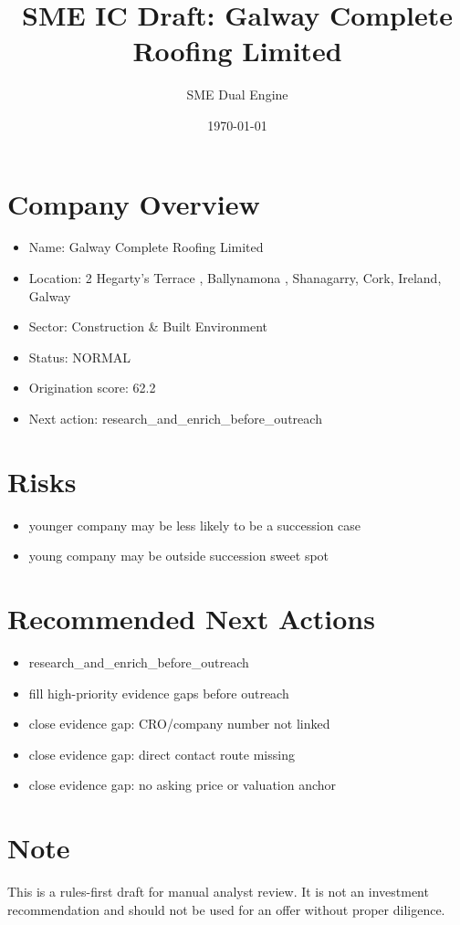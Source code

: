 \documentclass[11pt,a4paper]{article}
\title{SME IC Draft: Galway Complete Roofing Limited}
\author{SME Dual Engine}
\date{\today}
\begin{document}
\maketitle
\section*{Company Overview}
\begin{itemize}[leftmargin=1.4em]
\item Name: Galway Complete Roofing Limited
\item Location: 2 Hegarty's Terrace , Ballynamona , Shanagarry, Cork, Ireland, Galway
\item Sector: Construction \& Built Environment
\item Status: NORMAL
\item Origination score: 62.2
\item Next action: research\_and\_enrich\_before\_outreach
\end{itemize}
\section*{Risks}
\begin{itemize}[leftmargin=1.4em]
\item younger company may be less likely to be a succession case
\item young company may be outside succession sweet spot
\end{itemize}
\section*{Recommended Next Actions}
\begin{itemize}[leftmargin=1.4em]
\item research\_and\_enrich\_before\_outreach
\item fill high-priority evidence gaps before outreach
\item close evidence gap: CRO/company number not linked
\item close evidence gap: direct contact route missing
\item close evidence gap: no asking price or valuation anchor
\end{itemize}
\section*{Note}
This is a rules-first draft for manual analyst review. It is not an investment
recommendation and should not be used for an offer without proper diligence.
\end{document}
